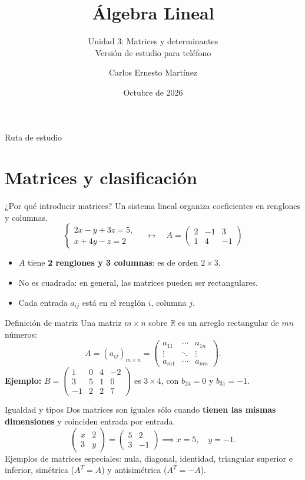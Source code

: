 \documentclass[aspectratio=169,11pt]{beamer}
\title{Álgebra Lineal}
\subtitle{Unidad 3: Matrices y determinantes\\Versión de estudio para teléfono}
\author{Carlos Ernesto Martínez}
\institute{Tecnológico Nacional de México · ACF-0903}
\date{Octubre de 2026}
\newcommand{\R}{\mathbb R}
\begin{document}
\begin{frame}\titlepage\end{frame}
\begin{frame}{Ruta de estudio}
\tableofcontents
\end{frame}
\section{Matrices y clasificación}
\begin{frame}{¿Por qué introducir matrices?}
Un sistema lineal organiza coeficientes en renglones y columnas.
\[\begin{cases}2x-y+3z=5,\\x+4y-z=2\end{cases}\quad\longleftrightarrow\quad A=\begin{pmatrix}2&-1&3\\1&4&-1\end{pmatrix}\]
\begin{itemize}\item $A$ tiene \textbf{2 renglones y 3 columnas}: es de orden $2\times3$.\item No es cuadrada: en general, las matrices pueden ser rectangulares.\item Cada entrada $a_{ij}$ está en el renglón $i$, columna $j$.\end{itemize}
\end{frame}
\begin{frame}{Definición de matriz}
Una matriz $m\times n$ sobre $\R$ es un arreglo rectangular de $mn$ números:
\[A=(a_{ij})_{m\times n}=\begin{pmatrix}a_{11}&\cdots&a_{1n}\\\vdots&\ddots&\vdots\\a_{m1}&\cdots&a_{mn}\end{pmatrix}.\]
\textbf{Ejemplo:} $B=\begin{pmatrix}1&0&4&-2\\3&5&1&0\\-1&2&2&7\end{pmatrix}$ es $3\times4$, con $b_{24}=0$ y $b_{31}=-1$.
\end{frame}
\begin{frame}{Igualdad y tipos}
Dos matrices son iguales sólo cuando \textbf{tienen las mismas dimensiones} y coinciden entrada por entrada.
\[\begin{pmatrix}x&2\\3&y\end{pmatrix}=\begin{pmatrix}5&2\\3&-1\end{pmatrix}\implies x=5,\quad y=-1.\]
Ejemplos de matrices especiales: nula, diagonal, identidad, triangular superior e inferior, simétrica ($A^T=A$) y antisimétrica ($A^T=-A$).
\end{frame}
\end{document}
